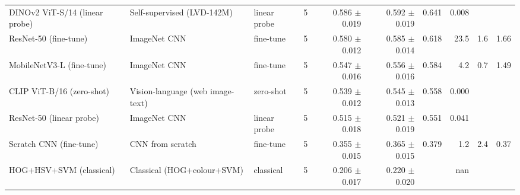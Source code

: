 \begin{table}[t]
\begin{tabular}{llllrrrrrr}
DINOv2 ViT-S/14 (linear probe) & Self-supervised (LVD-142M) & linear probe & 5 & 0.586 $\pm$ 0.019 & 0.592 $\pm$ 0.019 & 0.641 & 0.008 &  &  \\
ResNet-50 (fine-tune) & ImageNet CNN & fine-tune & 5 & 0.580 $\pm$ 0.012 & 0.585 $\pm$ 0.014 & 0.618 & 23.5 & 1.6 & 1.66 \\
MobileNetV3-L (fine-tune) & ImageNet CNN & fine-tune & 5 & 0.547 $\pm$ 0.016 & 0.556 $\pm$ 0.016 & 0.584 & 4.2 & 0.7 & 1.49 \\
CLIP ViT-B/16 (zero-shot) & Vision-language (web image-text) & zero-shot & 5 & 0.539 $\pm$ 0.012 & 0.545 $\pm$ 0.013 & 0.558 & 0.000 &  &  \\
ResNet-50 (linear probe) & ImageNet CNN & linear probe & 5 & 0.515 $\pm$ 0.018 & 0.521 $\pm$ 0.019 & 0.551 & 0.041 &  &  \\
Scratch CNN (fine-tune) & CNN from scratch & fine-tune & 5 & 0.355 $\pm$ 0.015 & 0.365 $\pm$ 0.015 & 0.379 & 1.2 & 2.4 & 0.37 \\
HOG+HSV+SVM (classical) & Classical (HOG+colour+SVM) & classical & 5 & 0.206 $\pm$ 0.017 & 0.220 $\pm$ 0.020 &  & nan &  &  \\
\bottomrule
\end{tabular}
\end{table}
